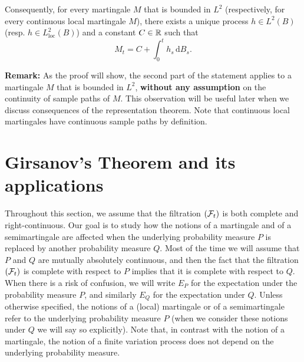 \documentclass[../Main.tex]{subfiles}
\begin{document}
Consequently, for every martingale $M$ that is bounded in $L^2$ (respectively, for every continuous local martingale $M$), there exists a unique process $h \in L^2(B)$ (resp. $h \in L^2_{\text{loc}}(B)$) and a constant $C \in \mathbb{R}$ such that
\[ M_t = C + \int_0^t h_s \, \mathrm{d}B_s. \]

\textbf{Remark:} 
As the proof will show, the second part of the statement applies to a martingale $M$ that is bounded in $L^2$, \textbf{without any assumption} on the continuity of sample paths of $M$. This observation will be useful later when we discuss consequences of the representation theorem. Note that continuous local martingales have continuous sample paths by definition.

\section{Girsanov's Theorem and its applications} %
Throughout this section, we assume that the filtration $(\mathcal{F}_t)$ is both complete and right-continuous. Our goal is to study how the notions of a martingale and of a semimartingale are affected when the underlying probability measure $P$ is replaced by another probability measure $Q$. Most of the time we will assume that $P$ and $Q$ are mutually absolutely continuous, and then the fact that the filtration $(\mathcal{F}_t)$ is complete with respect to $P$ implies that it is complete with respect to $Q$. When there is a risk of confusion, we will write $E_P$ for the expectation under the probability measure $P$, and similarly $E_Q$ for the expectation under $Q$. Unless otherwise specified, the notions of a (local) martingale or of a semimartingale refer to the underlying probability measure $P$ (when we consider these notions under $Q$ we will say so explicitly). Note that, in contrast with the notion of a martingale, the notion of a finite variation process does not depend on the underlying probability measure.
\end{document}
